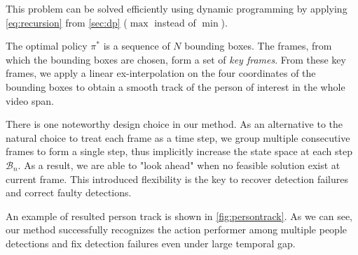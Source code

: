 This problem can be solved efficiently using dynamic programming by applying \autoref{eq:recursion} from \autoref{sec:dp} ($ \max $ instead of $ \min $). 

The optimal policy $ \pi^{*} $ is a sequence of $ N $ bounding boxes. The frames, from which the bounding boxes are chosen, form a set of \textit{key frames}. From these key frames, we apply a linear ex-interpolation on the four coordinates of the bounding boxes to obtain a smooth track of the person of interest in the whole video span. 

There is one noteworthy design choice in our method. 
As an alternative to the natural choice to treat each frame as a time step, we group multiple consecutive frames to form a single step, thus implicitly increase the state space at each step $ \mathcal{B}_{n} $.
As a result, we are able to "look ahead" when no feasible solution exist at current frame.
This introduced flexibility is the key to recover detection failures and correct faulty detections.

An example of resulted person track is shown in \autoref{fig:persontrack}. As we can see, our method successfully recognizes the action performer among multiple people detections and fix detection failures even under large temporal gap.

